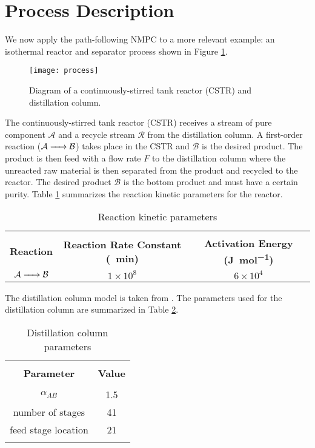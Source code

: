\section{Process Description}
We now apply the path-following NMPC to a more relevant example: an isothermal reactor and separator process shown in Figure \ref{fig:process}.
	\begin{figure}[H]
		\centering
		\texttt{[image: process]}
		\caption{Diagram of a continuously-stirred tank reactor (CSTR) and distillation column.}
		\label{fig:process}
	\end{figure}
The continuously-stirred tank reactor (CSTR) receives a stream of pure component $\mathcal{A}$ and a recycle stream $\mathcal{R}$ from the distillation column.
A first-order reaction ($\ce{\mathcal{A} -> \mathcal{B}}$) takes place in the CSTR and $\mathcal{B}$ is the desired product. 
The product is then feed with a flow rate $F$ to the distillation column where the unreacted raw material is then separated from the product and recycled to the reactor.
The desired product $\mathcal{B}$ is the bottom product and must have a certain purity.
Table \ref{tab:rxn_kin} summarizes the reaction kinetic parameters for the reactor.
\begin{table}[H]
	\centering
	\caption{Reaction kinetic parameters}
	\begin{tabular}{c c c}
		\toprule[0.3mm]\\
		\textbf{Reaction} & \textbf{Reaction Rate Constant (\si{\per\minute})} & \textbf{Activation Energy (\si{\joule\per\mole})}\\
		\midrule[0.2mm]
		$\ce{\mathcal{A} -> \mathcal{B}}$ & $1\times10^8$ & $6\times10^4$\\
		\bottomrule[0.3mm]
	\end{tabular}
	\label{tab:rxn_kin}
\end{table}
\par
The distillation column model is taken from \cite{model}.
The parameters used for the distillation column are summarized in Table \ref{tab:column}.
\begin{table}[H]
	\centering
	\caption{Distillation column parameters}
	\begin{tabular}{c c}
		\toprule[0.3mm]\\
		\textbf{Parameter} & \textbf{Value}\\
		\midrule[0.2mm]\\
		$\alpha_{AB}$ & 1.5\\
		number of stages & 41\\
		feed stage location & 21\\
		\bottomrule[0.3mm]\\
	\end{tabular}
	\label{tab:column}
\end{table}
